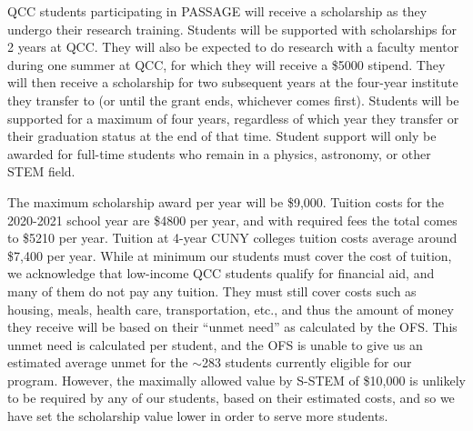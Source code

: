 \documentclass[12pt]{article}
\newcommand\new[1]{{\color{blue}#1}}
\begin{document}
QCC students participating in PASSAGE will receive a scholarship as they undergo their research training. Students will be supported with scholarships for 2 years at QCC.  They will also be expected to do research with a faculty mentor during one summer at QCC, for which they will receive a \$5000 stipend.  They will then receive a scholarship for two subsequent years at the four-year institute they transfer to (or until the grant ends, whichever comes first).  Students will be supported for a maximum of four years, regardless of which year they transfer or their graduation status at the end of that time. Student support will only be awarded for full-time students who remain in a physics, astronomy, or other STEM field.  

The maximum scholarship award per year will be \$9,000. Tuition costs for the 2020-2021 school year are \$4800 per year, and with required fees the total comes to \$5210 per year.  Tuition at 4-year CUNY colleges tuition costs average around \$7,400 per year.  While at minimum our students must cover the cost of tuition, we acknowledge that low-income QCC students qualify for financial aid, and many of them do not pay any tuition.  They must still cover costs such as housing, meals, health care, transportation, etc., and thus the amount of money they receive will be based on their ``\new{unmet} need'' as calculated by the OFS.   \new{This unmet need is calculated  per student, and the OFS is unable to give us an estimated average unmet for the $\sim$283 students currently eligible for our program.  However,  }  the maximally allowed value by S-STEM of \$10,000 is unlikely to be required by any of our students, based on their estimated costs, and so we have set the scholarship value lower in order to serve more students.
\end{document}
